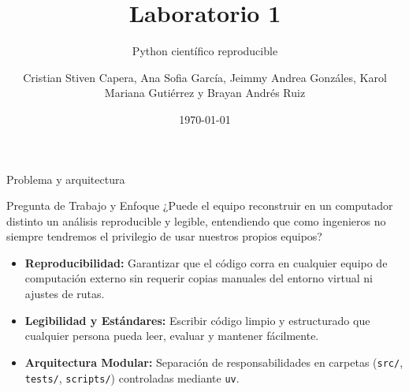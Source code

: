 \documentclass[aspectratio=169]{beamer}
\title{Laboratorio 1}
\subtitle{Python científico reproducible}
\author{Cristian Stiven Capera, Ana Sofia García, Jeimmy Andrea Gonzáles, Karol Mariana Gutiérrez y Brayan Andrés Ruiz}
\date{\today}
\begin{document}
\begin{frame}
    \titlepage
\end{frame}

\begin{frame}{Problema y arquitectura}
    \begin{block}{Pregunta de Trabajo y Enfoque}
        ¿Puede el equipo reconstruir en un computador distinto un análisis reproducible y legible, entendiendo que como ingenieros no siempre tendremos el privilegio de usar nuestros propios equipos?
    \end{block}
    \vspace{-0.1cm}
    \begin{itemize}
        \small
        \item \textbf{Reproducibilidad:} Garantizar que el código corra en cualquier equipo de computación externo sin requerir copias manuales del entorno virtual ni ajustes de rutas.
        \item \textbf{Legibilidad y Estándares:} Escribir código limpio y estructurado que cualquier persona pueda leer, evaluar y mantener fácilmente.
        \item \textbf{Arquitectura Modular:} Separación de responsabilidades en carpetas (\texttt{src/}, \texttt{tests/}, \texttt{scripts/}) controladas mediante \texttt{uv}.
    \end{itemize}
\end{frame}
\end{document}
